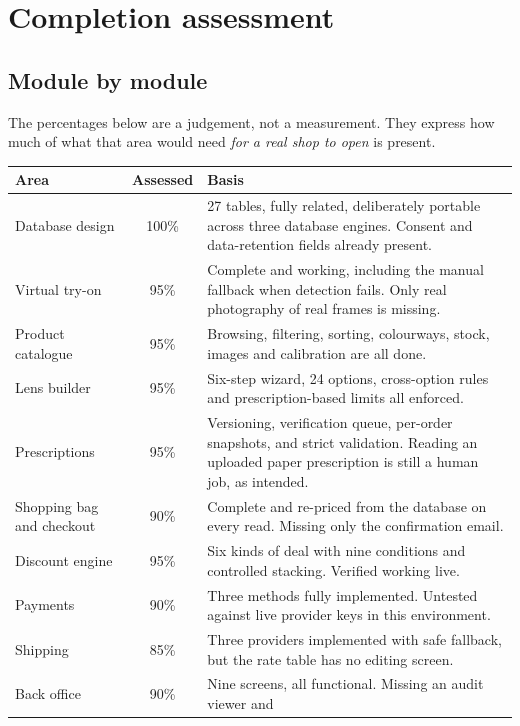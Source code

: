 \documentclass[11pt,a4paper]{report}
\begin{document}
\chapter{Completion assessment}

\section{Module by module}

The percentages below are a judgement, not a measurement. They express how
much of what that area would need \emph{for a real shop to open} is present.

\begin{longtable}{@{}p{}c p{}@{}}
\toprule
\textbf{Area} & \textbf{Assessed} & \textbf{Basis}\\
\midrule
\endhead
Database design & 100\% & 27 tables, fully related, deliberately portable
across three database engines. Consent and data-retention fields already
present.\\
\addlinespace
Virtual try-on & 95\% & Complete and working, including the manual fallback
when detection fails. Only real photography of real frames is missing.\\
\addlinespace
Product catalogue & 95\% & Browsing, filtering, sorting, colourways, stock,
images and calibration are all done.\\
\addlinespace
Lens builder & 95\% & Six-step wizard, 24 options, cross-option rules and
prescription-based limits all enforced.\\
\addlinespace
Prescriptions & 95\% & Versioning, verification queue, per-order snapshots,
and strict validation. Reading an uploaded paper prescription is still a human
job, as intended.\\
\addlinespace
Shopping bag and checkout & 90\% & Complete and re-priced from the database on
every read. Missing only the confirmation email.\\
\addlinespace
Discount engine & 95\% & Six kinds of deal with nine conditions and controlled
stacking. Verified working live.\\
\addlinespace
Payments & 90\% & Three methods fully implemented. Untested against live
provider keys in this environment.\\
\addlinespace
Shipping & 85\% & Three providers implemented with safe fallback, but the rate
table has no editing screen.\\
\addlinespace
Back office & 90\% & Nine screens, all functional. Missing an audit viewer and

\end{longtable}
\end{document}
